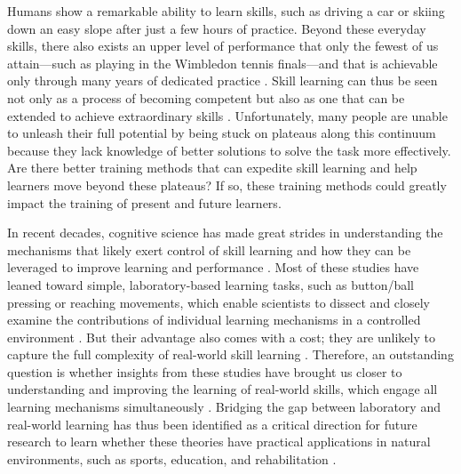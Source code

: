 
Humans show a remarkable ability to learn skills, such as driving a car or skiing down an easy slope after just a few hours of practice. Beyond these everyday skills, there also exists an upper level of performance that only the fewest of us attain—such as playing in the Wimbledon tennis finals—and that is achievable only through many years of dedicated practice \cite{hodges_predicting_2004, ericsson_role_1993, vaeyens_talent_2009}. Skill learning can thus be seen not only as a process of becoming competent but also as one that can be extended to achieve extraordinary skills \cite{ericsson_development_2003, ericsson_scientific_1998}. Unfortunately, many people are unable to unleash their full potential by being stuck on plateaus along this continuum because they lack knowledge of better solutions to solve the task more effectively\cite{thorndike_educational_1913, grayloooooong,grayshort,ericsson_scientific_1998, ericsson_development_2003}. Are there better training methods that can expedite skill learning and help learners move beyond these plateaus? If so, these training methods could greatly impact the training of present and future learners. 

In recent decades, cognitive science has made great strides in understanding the mechanisms that likely exert control of skill learning and how they can be leveraged to improve learning and performance \cite{wolpert_principles_2011, makino_circuit_2016, spampinato_multiple_2021, krakauer_motor_2019, haith_model-based_2013, huang_rethinking_2011, shmuelof_are_2011, doya_complementary_2000}. Most of these studies have leaned toward simple, laboratory-based learning tasks\cite{krakauer_motor_2019, du_relationship_2022}, such as button/ball pressing \cite{hardwick_time-dependent_2019, vassiliadis_reward_2021} or reaching movements\cite{shadmehr_adaptive_1994, krakauer_learning_2000},  which enable scientists to dissect and closely examine the contributions of individual learning mechanisms in a controlled environment \cite{spampinato_multiple_2021}. But their advantage also comes with a cost; they are unlikely to capture the full complexity of real-world skill learning \cite{krakauer_motor_2019, mangalam_investigating_2023, du_relationship_2022, chen_effects_2018, wolpert_principles_2011, gallivan_decision-making_2018, iyer_probing_2020, ingram_naturalistic_2011}. Therefore, an outstanding question is whether insights from these studies have brought us closer to understanding and improving the learning of real-world skills, which engage all learning mechanisms simultaneously \cite{spampinato_multiple_2021}. Bridging the gap between laboratory and real-world learning has thus been identified as a critical direction for future research to learn whether these theories have practical applications in natural environments, such as sports, education, and rehabilitation \cite{du_relationship_2022, wolpert_motor_2010, yarrow_inside_2009, haar_motor_2020, ingram_naturalistic_2011}.

